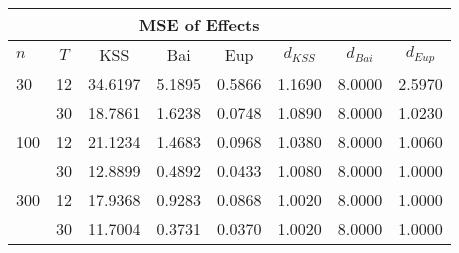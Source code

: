 \begin{tabular}{lccccccc} 
\hline \multicolumn{7}{c}{MSE of Effects} \\ \hline 
$n$ & $T$ & KSS & Bai & Eup & $d_{KSS}$ & $d_{Bai}$ & $d_{Eup}$ \\
\hline
30 & 12 &  34.6197  &  5.1895  &  0.5866  &  1.1690  &  8.0000  &  2.5970  \\
& 30 &  18.7861  &  1.6238  &  0.0748  &  1.0890  &  8.0000  &  1.0230  \\
100 & 12 &  21.1234  &  1.4683  &  0.0968  &  1.0380  &  8.0000  &  1.0060  \\
& 30 &  12.8899  &  0.4892  &  0.0433  &  1.0080  &  8.0000  &  1.0000  \\
300 & 12 &  17.9368  &  0.9283  &  0.0868  &  1.0020  &  8.0000  &  1.0000  \\
& 30 &  11.7004  &  0.3731  &  0.0370  &  1.0020  &  8.0000  &  1.0000  \\
\end{tabular} 
